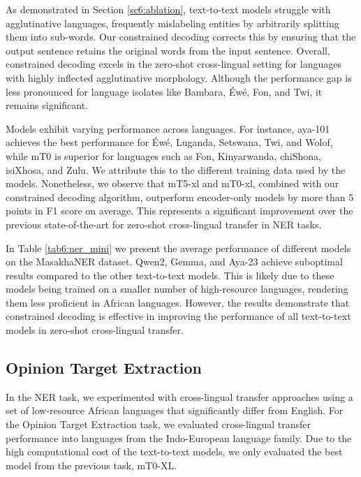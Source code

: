 As demonstrated in Section \ref{sc6:ablation}, text-to-text models struggle with agglutinative languages, frequently mislabeling entities by arbitrarily splitting them into sub-words. Our constrained decoding corrects this by ensuring that the output sentence retains the original words from the input sentence. Overall, constrained decoding excels in the zero-shot cross-lingual setting for languages with highly inflected agglutinative morphology. Although the performance gap is less pronounced for language isolates like Bambara, Éwé, Fon, and Twi, it remains significant.





Models exhibit varying performance across languages. For instance, aya-101 achieves the best performance for Éwé, Luganda, Setswana, Twi, and Wolof, while mT0 is superior for languages such as Fon, Kinyarwanda, chiShona, isiXhosa, and Zulu. We attribute this to the different training data used by the models. Nonetheless, we observe that mT5-xl and mT0-xl, combined with our constrained decoding algorithm, outperform encoder-only models by more than 5 points in F1 score on average. This represents a significant improvement over the previous state-of-the-art for zero-shot cross-lingual transfer in NER tasks.



In Table \ref{tab6:ner_mini} we present the average performance of different models on the MasakhaNER dataset. Qwen2, Gemma, and Aya-23 achieve suboptimal results compared to the other text-to-text models. This is likely due to these models being trained on a smaller number of high-resource languages, rendering them less proficient in African languages. However, the results demonstrate that constrained decoding is effective in improving the performance of all text-to-text models in zero-shot cross-lingual transfer.

\subsection{Opinion Target Extraction}
\label{sc6:ote}



In the NER task, we experimented with cross-lingual transfer approaches using a set of low-resource African languages that significantly differ from English. For the Opinion Target Extraction task, we evaluated cross-lingual transfer performance into languages from the Indo-European language family. Due to the high computational cost of the text-to-text models, we only evaluated the best model from the previous task, mT0-XL.

